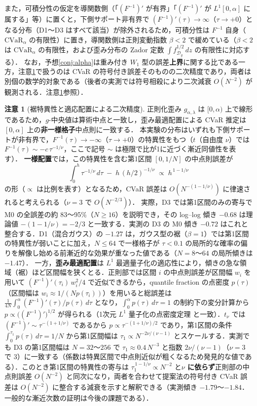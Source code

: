 \documentclass[a4paper,10pt]{jsarticle}
\theoremstyle{definition}
\newtheorem{remark}{注意}[section]
\newcommand{\CVaR}{\mathrm{CVaR}}
\newcommand{\Wone}{W_1}
\newcommand{\Finv}{F^{-1}}
\begin{document}
また，可積分性の仮定を導関数側（「$(\Finv)'$ が有界」「$(\Finv)'$ が $L^1[0,\alpha]$ に属する」等）に置くと，下側サポート非有界で $(\Finv)'(\tau)\to\infty$（$\tau\to+0$）となる分布（D1〜D3 はすべて該当）が除外されるため，可積分性は $\Finv$ 自身（$\CVaR_\alpha$ の有限性）に置き，導関数側は正則変動指数 $\beta<2$ で緩めている（$\beta<2$ は $\CVaR_\alpha$ の有限性，および歪み分布の Zador 定数 $\int f_{\mathcal D_g}^{1/2}\,dz$ の有限性に対応する）．
なお，予想\ref{conj:alpha}は重み付き $\Wone$ 型の誤差\textbf{上界}に関する比である一方，注意\ref{rem:midpoint}で扱うのは CVaR の符号付き誤差そのものの二次精度であり，両者は別個の数学的対象である（後者の実測では符号相殺により二次減衰 $O(N^{-2})$ が観測される．注意\ref{rem:midpoint}参照）．
\begin{remark}[裾特異性と適応配置による二次精度]
\label{rem:midpoint}
正則化歪み $g_{\alpha,\lambda}$ は $[0,\alpha)$ 上で線形であるため，$g$-中央値は算術中点と一致し，歪み最適配置による CVaR 推定は $[0,\alpha]$ 上の\textbf{非一様格子}中点則に一致する．
本実験の分布はいずれも下側サポートが非有界で，$\Finv(\tau)\to-\infty$（$\tau\to+0$）の特異性をもつ（$t$（自由度 $\nu$）では $\Finv(\tau)\sim -c\,\tau^{-1/\nu}$，ここで記号 $\sim$ は極限で比が1に近づく漸近同値性を表す）．
\textbf{一様配置}では，この特異性を含む第1区間 $[0,1/N]$ の中点則誤差が
\begin{equation*}
  \int_0^h\tau^{-1/\nu}\,d\tau\;-\;h\,(h/2)^{-1/\nu}\;\propto\; h^{\,1-1/\nu}
\end{equation*}
の形（$\propto$ は比例を表す）となるため，CVaR 誤差は $O(N^{-(1-1/\nu)})$ に律速されると考えられる（$\nu=3$ で $O(N^{-2/3})$）．
実際，D3 では第1区間のみの寄与で M0 の全誤差の約 83〜95\%（$N\ge16$）を説明でき，その log--log 傾き $-0.68$ は理論値 $-(1-1/\nu)=-2/3$ と一致する．実測の D3 の M0 傾き $-0.72$ はこれと整合する．D1（混合ガウス）の $-1.27$ は，ガウス型の裾（$\beta=1$）では第1区間の特異性が弱いことに加え，$N\le64$ で一様格子が $\tau<0.1$ の局所的な確率の偏りを解像し始める前漸近的な効果が重なった値である（$N=8$〜$64$ の局所傾きは $-1.47$）．
一方，\textbf{歪み最適配置}は $L^1$ 最適量子化の適応性により，傾きの急な領域（裾）ほど区間幅を狭くとる．正則部では区間 $i$ の中点則誤差が区間幅 $w_i$ を用いて $(\Finv)'(\tau_i)\,w_i^2/4$ で近似できるから，quantile fraction の点密度 $p(\tau)$（区間幅は $w_i\approx1/(Np(\tau_i))$）を用いると総誤差は $\frac{1}{4N}\int_0^\alpha(\Finv)'(\tau)/p(\tau)\,d\tau$ となり，$\int_0^\alpha p(\tau)\,d\tau=1$ の制約下の変分計算から $p\propto\bigl((\Finv)'\bigr)^{1/2}$ が得られる（1次元 $L^1$ 量子化の点密度定理 \cite{graf2000quantization} と一致）．$t_\nu$ では $(\Finv)'\sim\tau^{-(1+1/\nu)}$ であるから $p\propto\tau^{-(1+1/\nu)/2}$ であり，第1区間の条件 $\int_0^{\tau_1}p(\tau)\,d\tau=1/N$ から第1区間幅は $\tau_1\propto N^{-2\nu/(\nu-1)}$ とスケールする．実測でも D3 の第1区間幅は $N=32$〜$256$ で $\tau_1\approx0.4\,N^{-3}$ と指数 $2\nu/(\nu-1)$（$\nu=3$ で $3$）に一致する（係数は特異区間で中点則近似が粗くなるため発見的な値である）．このとき第1区間の特異性の寄与は $\tau_1^{\,1-1/\nu}\propto N^{-2}$ と\textbf{$\nu$ に依らず}正則部の中点則誤差 $O(N^{-2})$ と同次になり，両者を合わせて提案法の符号付き CVaR 誤差は $O(N^{-2})$ に整合する減衰を示すと解釈できる（実測傾き $-1.79$〜$-1.84$．一般的な漸近次数の証明は今後の課題である）．

\end{remark}
\end{document}
